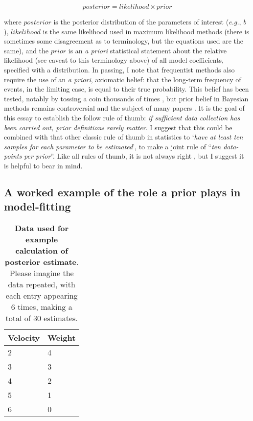 \documentclass[12pt]{report}
\newcommand{\eg}{\emph{e.g.}\xspace}
\begin{document}
\begin{equation}
  posterior = likelihood \times prior
\end{equation}

where $posterior$ is the posterior distribution of the parameters of interest (\eg, $b$), $likelihood$ is the same likelihood used in maximum likelihood methods (there is sometimes some disagreement as to terminology, but the equations used are the same), and the $prior$ is an \emph{a priori} statistical statement about the relative likelihood (see caveat to this terminology above) of all model coefficients, specified with a distribution. In passing, I note that frequentist methods also require the use of an \emph{a priori}, axiomatic belief: that the long-term frequency of events, in the limiting case, is equal to their true probability. This belief has been tested, notably by tossing a coin thousands of times \autocite{Kerrich1950}, but prior belief in Bayesian methods remains controversial and the subject of many papers \autocite{Banner2020}. It is the goal of this essay to establish the follow rule of thumb: \emph{if sufficient data collection has been carried out, prior definitions rarely matter}. I suggest that this could be combined with that other classic rule of thumb in statistics to `\emph{have at least ten samples for each parameter to be estimated}', to make a joint rule of ``\emph{ten data-points per prior}''. Like all rules of thumb, it is not always right \autocite[no rule can be simultaneously always applicable and always right;][]{Godel1931}, but I suggest it is helpful to bear in mind.

\subsection*{A worked example of the role a prior plays in model-fitting}
\begin{table}
  \begin{tabular}{l l} \hline
    \textbf{Velocity} & \textbf{Weight}\\ \hline
    2 & 4 \\
    3 & 3 \\
    4 & 2 \\
    5 & 1 \\
    6 & 0 \\ \hline
  \end{tabular}
  \caption{\textbf{Data used for example calculation of posterior estimate}. Please imagine the data repeated, with each entry appearing 6 times, making a total of 30 estimates.} \label{data}
\end{table}
\end{document}
